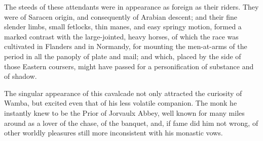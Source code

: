 The steeds of these attendants were in appearance as foreign as their
riders. They were of Saracen origin, and consequently of Arabian
descent; and their fine slender limbs, small fetlocks, thin manes, and
easy springy motion, formed a marked contrast with the large-jointed,
heavy horses, of which the race was cultivated in Flanders and in
Normandy, for mounting the men-at-arms of the period in all the panoply
of plate and mail; and which, placed by the side of those Eastern
coursers, might have passed for a personification of substance and of
shadow.

The singular appearance of this cavalcade not only attracted the
curiosity of Wamba, but excited even that of his less volatile
companion. The monk he instantly knew to be the Prior of Jorvaulx Abbey,
well known for many miles around as a lover of the chase, of the
banquet, and, if fame did him not wrong, of other worldly pleasures
still more inconsistent with his monastic vows.

